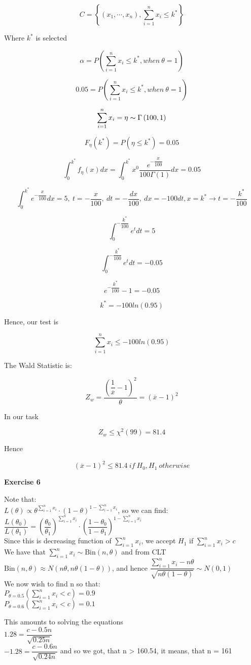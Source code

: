 \documentclass[12pt]{article}
\begin{document}
\begin{list}{()~}{}
\[ C =\left\{\left(x_1, \cdots, x_n\right), \sum_{i=1}^n x_i\leq k^*\right\}\]

Where $k^*$ is selected 

\[\alpha = P\left(\sum_{i=1}^n x_i \leq k^*, when\  \theta=1\right)\]

\[0.05 = P\left(\sum_{i=1}^n x_i \leq k^*, when\  \theta=1\right)\]

\[\sum_{i=1}^n x_i = \eta \thicksim \Gamma\left(100, 1\right)\]

\[F_\eta\left(k^*\right)=P\left(\eta\leq k^*\right)=0.05\]

\[\int_0^{k^*}f_\eta\left( x\right)dx=\int_0^{k^*}x^0 \dfrac{e^{-\dfrac{x}{100}}}{100\Gamma\left(1\right)}dx=0.05\]

\[\int_0^{k^*}e^{-\dfrac{x}{100}}dx=5,\ t=-\dfrac{x}{100},\ dt=-\dfrac{dx}{100},\ dx=-100dt, x=k^* \rightarrow t=-\dfrac{k^*}{100} \]

\[\int _0^{-\dfrac{k^*}{100}}e^t dt=5\]

\[\int _0^{-\dfrac{k^*}{100}}e^t dt =-0.05\]

\[e^{-\dfrac{k^*}{100}}-1=-0.05\]

\[k^*=-100ln\left(0.95\right)\]

Hence, our test is

\[\sum_{i=1}^n x_i \leq -100ln\left(0.95\right)\]

\item
The Wald Statistic is:

\[Z_w=\dfrac{\left(\dfrac{1}{\overline{x}}-1\right)^2}{\theta} = \left({\overline{x}}-1\right)^2\]

In our task 

\[Z_w\leq \chi^2\left(99\right)=81.4\]

Hence

\[\left({\overline{x}}-1\right)^2\leq 81.4\ if\ H_0, H_1\ otherwise\]

\end{list}

\medskip

\textbf{Exercise 6}

Note that:\\

$L(\theta) \propto \theta^{\sum^n_{i = 1} x_i} \cdot \left( 1 - \theta \right)^{1 - \sum^n_{i = 1} x_i}$, so we can find:\\
$\dfrac{L(\theta_0)}{L(\theta_1)} = \left( \dfrac{\theta_0}{\theta_1} \right)^{\sum^n_{i = 1} x_i} \cdot \left( \dfrac{1- \theta_0}{ 1 - \theta_1} \right)^{1 - \sum^n_{i = 1} x_i}$ \\
Since this is decreasing function of $\sum^n_{i = 1} x_i$, we accept $H_1$ if $\sum^n_{i = 1} x_i > c$\\
We have that $\sum^n_{i = 1} x_i \sim \mathrm{Bin}(n, \theta)$ and from CLT $\mathrm{Bin}(n,\theta) \approx N( n\theta, n\theta (1 - \theta) )$, and hence  $\dfrac{\sum^n_{i = 1} x_i - n\theta}{\sqrt{n \theta (1 - \theta)}} \sim N(0,1)$\\
We now wish to find n so that:\\
$P_{\theta = 0.5} \left( \sum^n_{i = 1} x_i < c \right) = 0.9$\\
$P_{\theta = 0.6} \left( \sum^n_{i = 1} x_i < c \right) = 0.1$

This amounts to solving the equations\\
$1.28 = \dfrac{c - 0.5n}{\sqrt{0.25n}}$\\
$-1.28 = \dfrac{c - 0.6n}{\sqrt{0.24n}}$ and so we got, that n > 160.54, it means, that n = 161
\end{document}
